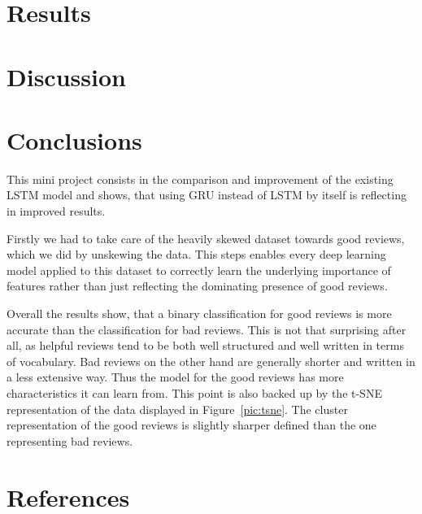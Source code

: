 \documentclass[a4paper,11pt]{article}
\begin{document}
\section{Results}


\section{Discussion}


\section{Conclusions}

This mini project consists in the comparison and improvement of the existing LSTM model \cite{wei} and shows, that using GRU instead of LSTM by itself is reflecting in improved results. 
 
Firstly we had to take care of the heavily skewed dataset towards good reviews, which we did by unskewing the data. This steps enables every deep learning model applied to this dataset to correctly learn the underlying importance of features rather than just reflecting the dominating presence of good reviews.

Overall the results show, that a binary classification for good reviews is more accurate than the classification for bad reviews. This is not that surprising after all, as helpful reviews tend to be both well structured and well written in terms of vocabulary. Bad reviews on the other hand are generally shorter and written in a less extensive way. Thus the model for the good reviews has more characteristics it can learn from. This point is also backed up by the t-SNE representation of the data displayed in Figure~\ref{pic:tsne}. The cluster representation of the good reviews is slightly sharper defined than the one representing bad reviews.


\section{References}
{}

\end{document}

